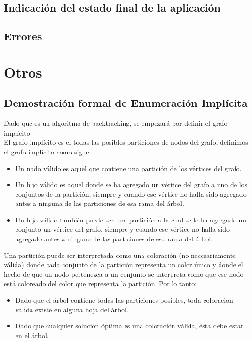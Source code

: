 \documentclass[a4paper,10pt]{article}
\begin{document}
\subsection{Indicación del estado final de la aplicación}

\subsection{Errores}


\section{Otros}
\subsection{Demostración formal de Enumeración Implícita}
Dado que es un algoritmo de backtracking, se empezar\'a por definir el
grafo impl\'icito.\\
\indent El grafo impl\'icito es el todas las posibles particiones de
nodos del grafo, definimos el grafo impl\'icito como sigue:
\begin{itemize}
 \item Un nodo v\'alido es aquel que contiene una partici\'on de los
       v\'ertices del grafo. 
 \item Un hijo v\'alido es aquel donde se ha agregado un v\'ertice del
       grafo a uno de los conjuntos de la partici\'on, siempre y cuando
       ese v\'ertice no halla sido agregado antes a ninguna de las
       particiones de esa rama del \'arbol.
 \item Un hijo v\'alido tambi\'en puede ser una partici\'on a la cual se
       le ha agregado un conjunto un v\'ertice del grafo, siempre y
       cuando ese v\'ertice no halla sido agregado antes a ninguna de
       las particiones de esa rama del \'arbol.
\end{itemize}
\indent Una partici\'on puede ser interpretada como una coloraci\'on (no
necesariamente v\'alida) donde cada conjunto de la partici\'on
representa un color \'unico y donde el hecho de que un nodo pertenezca a
un conjunto se interpreta como que ese nodo est\'a coloreado del color
que representa la partici\'on.
Por lo tanto:
\begin{itemize}
 \item Dado que el \'arbol contiene todas las particiones posibles,
 toda coloracion v\'alida existe en alguna hoja del \'arbol.
 \item Dado que cualquier soluci\'on \'optima es una coloraci\'on
 v\'alida, \'esta debe estar en el \'arbol.
\end{itemize}
\end{document}
